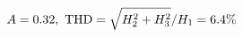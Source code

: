 \documentclass[preview]{standalone}
\begin{document}
\begin{align*}
\special{dvisvgm:raw <g id='unique000'>}A=0.32,\ \text{THD}=\sqrt{H_2^2+H_3^2}/H_1=6.4\%\special{dvisvgm:raw </g>}
\end{align*}
\end{document}
